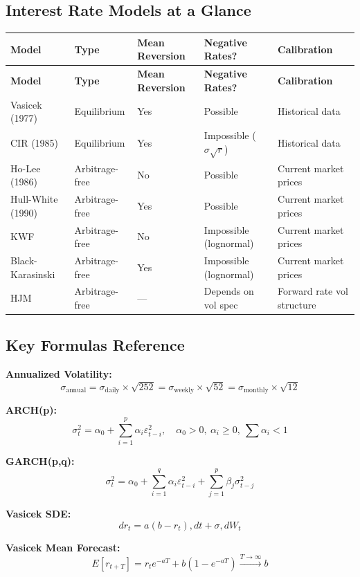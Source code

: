 \documentclass[12pt,openany]{book}
\theoremstyle{definition}
\theoremstyle{remark}
\begin{document}
\subsection{Interest Rate Models at a Glance}
\begingroup
\footnotesize
\begin{longtable}{@{}L{0.12\textwidth}L{0.19\textwidth}L{0.19\textwidth}L{0.19\textwidth}L{0.19\textwidth}@{}}
\toprule
\textbf{Model} & \textbf{Type} & \textbf{Mean Reversion} & \textbf{Negative Rates?} & \textbf{Calibration} \\
\midrule
\endfirsthead
\toprule
\textbf{Model} & \textbf{Type} & \textbf{Mean Reversion} & \textbf{Negative Rates?} & \textbf{Calibration} \\
\midrule
\endhead
Vasicek (1977) & Equilibrium & Yes & Possible & Historical data \\
CIR (1985) & Equilibrium & Yes & Impossible ($\sigma\sqrt{r}$) & Historical data \\
Ho-Lee (1986) & Arbitrage-free & No & Possible & Current market prices \\
Hull-White (1990) & Arbitrage-free & Yes & Possible & Current market prices \\
KWF & Arbitrage-free & No & Impossible (lognormal) & Current market prices \\
Black-Karasinski & Arbitrage-free & Yes & Impossible (lognormal) & Current market prices \\
HJM & Arbitrage-free & --- & Depends on vol spec & Forward rate vol structure \\
\bottomrule
\end{longtable}
\endgroup
\subsection{Key Formulas Reference}
\textbf{Annualized Volatility:} \[
\sigma_{\text{annual}} = \sigma_{\text{daily}} \times \sqrt{252} = \sigma_{\text{weekly}} \times \sqrt{52} = \sigma_{\text{monthly}} \times \sqrt{12}
\]

\textbf{ARCH(p):} \[
\sigma^2_t = \alpha_0 + \sum_{i=1}^{p} \alpha_i \varepsilon^2_{t-i}, \quad \alpha_0 > 0, \ \alpha_i \geq 0, \ \sum \alpha_i < 1
\]

\textbf{GARCH(p,q):} \[
\sigma^2_t = \alpha_0 + \sum_{i=1}^{q} \alpha_i \varepsilon^2_{t-i} + \sum_{j=1}^{p} \beta_j \sigma^2_{t-j}
\]

\textbf{Vasicek SDE:} \[
dr_t = a(b - r_t) , dt + \sigma , dW_t
\]

\textbf{Vasicek Mean Forecast:} \[
E[r_{t+T}] = r_t e^{-aT} + b(1 - e^{-aT}) \xrightarrow{T \to \infty} b
\]
\end{document}
